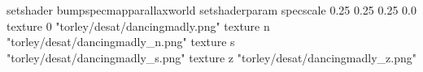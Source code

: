 setshader bumpspecmapparallaxworld
setshaderparam specscale 0.25 0.25 0.25 0.0
texture 0 "torley/desat/dancingmadly.png"
texture n "torley/desat/dancingmadly_n.png"
texture s "torley/desat/dancingmadly_s.png"
texture z "torley/desat/dancingmadly_z.png"

